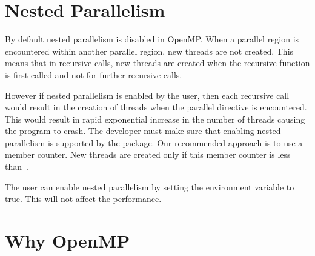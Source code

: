 
\section{Nested Parallelism\label{sec:nested_parallelism}}

By default nested parallelism is disabled in OpenMP. When a parallel
region is encountered within another parallel region, new threads are
not created. This means that in recursive calls, new threads are
created when the recursive function is first called and not for
further recursive calls.



However if nested parallelism is enabled by the user, then each
recursive call would result in the creation of threads when the
parallel directive is encountered.
This would result in rapid exponential increase in the number of
threads causing the program to crash.
The developer must make sure that enabling nested parallelism is
supported by the package.
Our recommended approach is to use a member counter. New threads are
created only if this member counter is less
than~.

The user can enable nested parallelism by setting the environment
variable  to true. This will not affect the
performance.

\section{Why OpenMP\label{sec:why_openmp}}

